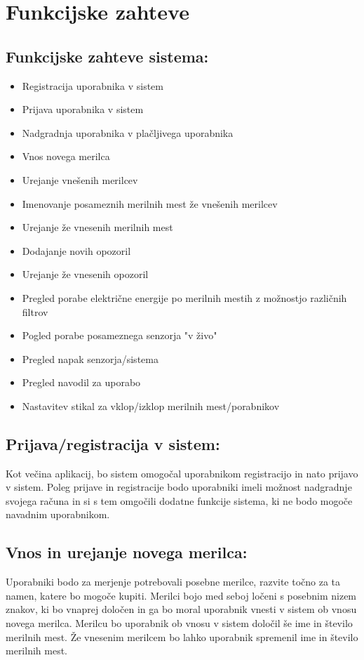 \documentclass[12pt,a4paper,titlepage,openany]{report}
\begin{document}
\section{Funkcijske zahteve}
\thispagestyle{fancy}

\subsection{Funkcijske zahteve sistema:}
\begin{itemize}

\item Registracija uporabnika v sistem
\item Prijava uporabnika v sistem
\item Nadgradnja uporabnika v plačljivega uporabnika
\item Vnos novega merilca
\item Urejanje vnešenih merilcev
\item Imenovanje posameznih merilnih mest že vnešenih merilcev
\item Urejanje že vnesenih merilnih mest
\item Dodajanje novih opozoril
\item Urejanje že vnesenih opozoril
\item Pregled porabe električne energije po merilnih mestih z možnostjo različnih filtrov
\item Pogled porabe posameznega senzorja "v živo"
\item Pregled napak senzorja/sistema
\item Pregled navodil za uporabo
\item Nastavitev stikal za vklop/izklop merilnih mest/porabnikov

\end{itemize}

\subsection{Prijava/registracija v sistem:}
Kot večina aplikacij, bo sistem omogočal uporabnikom registracijo in nato prijavo v sistem. Poleg prijave in registracije bodo uporabniki imeli možnost nadgradnje svojega računa in si s tem omgočili dodatne funkcije sistema, ki ne bodo mogoče navadnim uporabnikom.

\subsection{Vnos in urejanje novega merilca:}
Uporabniki bodo za merjenje potrebovali posebne merilce, razvite točno za ta namen, katere bo mogoče kupiti. Merilci bojo med seboj ločeni s posebnim nizem znakov, ki bo vnaprej določen in ga bo moral uporabnik vnesti v sistem ob vnosu novega merilca. Merilcu bo uporabnik ob vnosu v sistem določil še ime in število merilnih mest. Že vnesenim merilcem bo lahko uporabnik spremenil ime in število merilnih mest.
\end{document}
